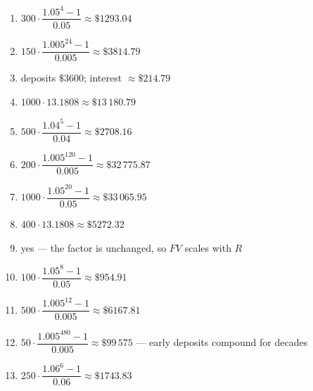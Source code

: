 \documentclass[11pt]{article}
\begin{document}
\begin{keybox}
\begin{multicols}{2}
\small
\begin{enumerate}[leftmargin=*,itemsep=3pt]
  \item $300\cdot\dfrac{1.05^4-1}{0.05}\approx\$1293.04$
  \item $150\cdot\dfrac{1.005^{24}-1}{0.005}\approx\$3814.79$
  \item deposits $\$3600$; interest $\approx\$214.79$
  \item $1000\cdot13.1808\approx\$13\,180.79$
  \item $500\cdot\dfrac{1.04^5-1}{0.04}\approx\$2708.16$
  \item $200\cdot\dfrac{1.005^{120}-1}{0.005}\approx\$32\,775.87$
  \item $1000\cdot\dfrac{1.05^{20}-1}{0.05}\approx\$33\,065.95$
  \item $400\cdot13.1808\approx\$5272.32$
  \item yes — the factor is unchanged, so $FV$ scales with $R$
  \item $100\cdot\dfrac{1.05^8-1}{0.05}\approx\$954.91$
  \item $500\cdot\dfrac{1.005^{12}-1}{0.005}\approx\$6167.81$
  \item $50\cdot\dfrac{1.005^{480}-1}{0.005}\approx\$99\,575$ — early deposits compound for decades
  \item $250\cdot\dfrac{1.06^6-1}{0.06}\approx\$1743.83$
\end{enumerate}
\end{multicols}
\end{keybox}
\end{document}
